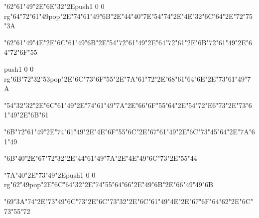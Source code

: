 \centerline{\ipa\char"62\ipa\char"61\ipa\char"49\ipa\char"2E\ipa\char"6E\ipa\char"32\ipa\char"2E\pdfcolorstack\match push{1 0 0 rg}\ipa\char"64\ipa\char"72\ipa\char"61\ipa\char"49\pdfcolorstack\match pop{}\ipa\char"2E\ipa\char"74\ipa\char"61\ipa\char"49\ipa\char"6B\ipa\char"2E\ipa\char"44\ipa\char"40\ipa\char"7E\ipa\char"54\ipa\char"74\ipa\char"2E\ipa\char"4E\ipa\char"32\ipa\char"6C\ipa\char"64\ipa\char"2E\ipa\char"72\ipa\char"75\ipa\char"3A}\bigskip
\centerline{\ipa\char"62\ipa\char"61\ipa\char"49\ipa\char"4E\ipa\char"2E\ipa\char"6C\ipa\char"61\ipa\char"49\ipa\char"6B\ipa\char"2E\ipa\char"54\ipa\char"72\ipa\char"61\ipa\char"49\ipa\char"2E\ipa\char"64\ipa\char"72\ipa\char"61\ipa\char"2E\ipa\char"6B\ipa\char"72\ipa\char"61\ipa\char"49\ipa\char"2E\ipa\char"64\ipa\char"72\ipa\char"6F\ipa\char"55}
\vfill\eject
\null\vfill
\centerline{\pdfcolorstack\match push{1 0 0 rg}\ipa\char"6B\ipa\char"72\ipa\char"32\ipa\char"53\pdfcolorstack\match pop{}\ipa\char"2E\ipa\char"6C\ipa\char"73\ipa\char"6F\ipa\char"55\ipa\char"2E\ipa\char"7A\ipa\char"61\ipa\char"72\ipa\char"2E\ipa\char"68\ipa\char"61\ipa\char"64\ipa\char"6E\ipa\char"2E\ipa\char"73\ipa\char"61\ipa\char"49\ipa\char"7A}\bigskip
\centerline{\ipa\char"54\ipa\char"32\ipa\char"32\ipa\char"2E\ipa\char"6C\ipa\char"61\ipa\char"49\ipa\char"2E\ipa\char"74\ipa\char"61\ipa\char"49\ipa\char"7A\ipa\char"2E\ipa\char"66\ipa\char"6F\ipa\char"55\ipa\char"64\ipa\char"2E\ipa\char"54\ipa\char"72\ipa\char"E6\ipa\char"73\ipa\char"2E\ipa\char"73\ipa\char"61\ipa\char"49\ipa\char"2E\ipa\char"6B\ipa\char"61}\bigskip
\centerline{\ipa\char"6B\ipa\char"72\ipa\char"61\ipa\char"49\ipa\char"2E\ipa\char"74\ipa\char"61\ipa\char"49\ipa\char"2E\ipa\char"4E\ipa\char"6F\ipa\char"55\ipa\char"6C\ipa\char"2E\ipa\char"67\ipa\char"61\ipa\char"49\ipa\char"2E\ipa\char"6C\ipa\char"73\ipa\char"45\ipa\char"64\ipa\char"2E\ipa\char"7A\ipa\char"61\ipa\char"49}
\vfill\eject
\null\vfill
\centerline{\ipa\char"6B\ipa\char"40\ipa\char"2E\ipa\char"67\ipa\char"72\ipa\char"32\ipa\char"2E\ipa\char"44\ipa\char"61\ipa\char"49\ipa\char"7A\ipa\char"2E\ipa\char"4E\ipa\char"49\ipa\char"6C\ipa\char"73\ipa\char"2E\ipa\char"55\ipa\char"44}\bigskip
\centerline{\ipa\char"7A\ipa\char"40\ipa\char"2E\ipa\char"73\ipa\char"49\ipa\char"2E\pdfcolorstack\match push{1 0 0 rg}\ipa\char"62\ipa\char"49\pdfcolorstack\match pop{}\ipa\char"2E\ipa\char"6C\ipa\char"64\ipa\char"32\ipa\char"2E\ipa\char"74\ipa\char"55\ipa\char"64\ipa\char"66\ipa\char"2E\ipa\char"49\ipa\char"6B\ipa\char"2E\ipa\char"66\ipa\char"49\ipa\char"49\ipa\char"6B}\bigskip
\centerline{\ipa\char"69\ipa\char"3A\ipa\char"74\ipa\char"2E\ipa\char"73\ipa\char"49\ipa\char"6C\ipa\char"73\ipa\char"2E\ipa\char"6C\ipa\char"73\ipa\char"32\ipa\char"2E\ipa\char"6C\ipa\char"61\ipa\char"49\ipa\char"4E\ipa\char"2E\ipa\char"67\ipa\char"6F\ipa\char"64\ipa\char"62\ipa\char"2E\ipa\char"6C\ipa\char"73\ipa\char"55\ipa\char"72}
